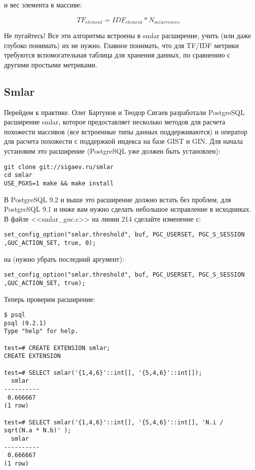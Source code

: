и вес элемента в массиве:

\begin{equation}
 \label{eq:smlar6}
 TF_{element} = IDF_{element} * N_{occurrences}
\end{equation}

Не пугайтесь! Все эти алгоритмы встроены в smlar расширение, учить (или даже глубоко понимать) их не нужно. Главное понимать, что для TF/IDF метрики требуются вспомогательная таблица для хранения данных, по сравнению с другими простыми метриками.

\subsection{Smlar}

Перейдем к практике. Олег Бартунов и Теодор Сигаев разработали PostgreSQL расширение smlar, которое предоставляет несколько методов для расчета похожести массивов (все встроенные типы данных поддерживаются) и оператор для расчета похожести с поддержкой индекса на базе GIST и GIN. Для начала установим это расширение (PostgreSQL уже должен быть установлен):

\begin{lstlisting}[label=lst:smlar1,caption=Установка smlar]
git clone git://sigaev.ru/smlar
cd smlar
USE_PGXS=1 make && make install
\end{lstlisting}

В PostgreSQL 9.2 и выше это расширение должно встать без проблем, для PostgreSQL 9.1 и ниже вам нужно сделать небольшое исправление в исходниках. В файле <<smlar\_guc.c>> на линии 214 сделайте изменение с:

\begin{lstlisting}[label=lst:smlar2,caption=Фикс для 9.1 и ниже]
set_config_option("smlar.threshold", buf, PGC_USERSET, PGC_S_SESSION ,GUC_ACTION_SET, true, 0);
\end{lstlisting}

на (нужно убрать последний аргумент):

\begin{lstlisting}[label=lst:smlar3,caption=Фикс для 9.1 и ниже]
set_config_option("smlar.threshold", buf, PGC_USERSET, PGC_S_SESSION ,GUC_ACTION_SET, true);
\end{lstlisting}

Теперь проверим расширение:

\begin{lstlisting}[label=lst:smlar4,caption=Проверка smlar]
$ psql
psql (9.2.1)
Type "help" for help.

test=# CREATE EXTENSION smlar;
CREATE EXTENSION

test=# SELECT smlar('{1,4,6}'::int[], '{5,4,6}'::int[]);
  smlar  
----------
 0.666667
(1 row)

test=# SELECT smlar('{1,4,6}'::int[], '{5,4,6}'::int[], 'N.i / sqrt(N.a * N.b)' );
  smlar  
----------
 0.666667
(1 row)
\end{lstlisting}


